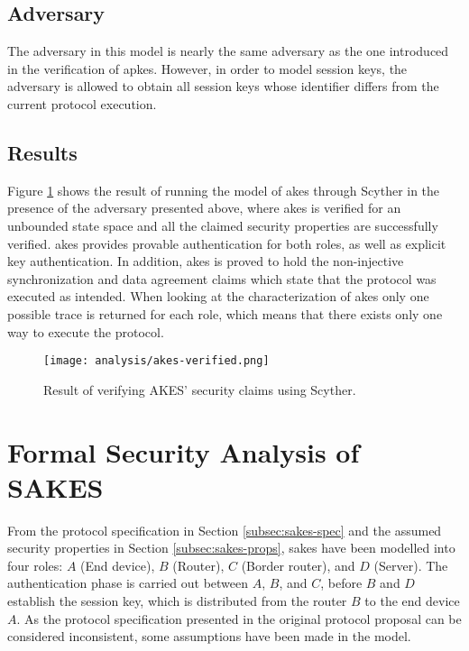 \subsection{Adversary}

The adversary in this model is nearly the same adversary as the one introduced in the verification of \gls{apkes}. However, in order to model session keys, the adversary is allowed to obtain all session keys whose identifier differs from the current protocol execution. 

\subsection{Results}

Figure \ref{fig:akes-verified} shows the result of running the model of \gls{akes} through Scyther in the presence of the adversary presented above, where \gls{akes} is verified for an unbounded state space and all the claimed security properties are successfully verified. \gls{akes} provides provable authentication for both roles, as well as explicit key authentication. In addition, \gls{akes} is proved to hold the non-injective synchronization and data agreement claims which state that the protocol was executed as intended. When looking at the characterization of \gls{akes} only one possible trace is returned for each role, which means that there exists only one way to execute the protocol.

\begin{figure}[h]
	\centering
	\texttt{[image: analysis/akes-verified.png]}
	\caption{Result of verifying AKES' security claims using Scyther.}
	\label{fig:akes-verified}
\end{figure}


\section{Formal Security Analysis of SAKES}
\label{sec:anal-sakes}

From the protocol specification in Section \ref{subsec:sakes-spec} and the assumed security properties in Section \ref{subsec:sakes-props}, \gls{sakes} have been modelled into four roles: $A$ (End device), $B$ (Router), $C$ (Border router), and $D$ (Server). The authentication phase is carried out between $A$, $B$, and $C$, before $B$ and $D$ establish the session key, which is distributed from the router $B$ to the end device $A$. As the protocol specification presented in the original protocol proposal can be considered inconsistent, some assumptions have been made in the model.

